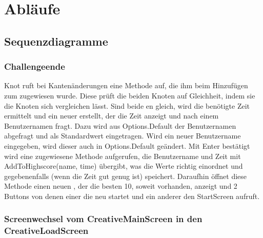 \chapter{Abläufe}

\section{Sequenzdiagramme}

\subsection{Challengeende}

Knot ruft bei Kantenänderungen eine Methode auf, die ihm beim Hinzufügen zum  zugewiesen wurde. Diese prüft die beiden Knoten auf Gleichheit, indem sie die Knoten sich vergleichen lässt. Sind beide en gleich, wird die benötigte Zeit ermittelt und ein neuer  erstellt, der die Zeit anzeigt und nach einem Benutzernamen fragt.
\newline
\newline
Dazu wird aus Options.Default der Benutzernamen abgefragt und als Standardwert eingetragen. Wird ein neuer Benutzername eingegeben, wird dieser auch in Options.Default geändert. Mit Enter bestätigt wird eine zugewiesene Methode aufgerufen, die Benutzername und Zeit  mit AddToHighscore(name, time) übergibt, was die Werte richtig einordnet und gegebenenfalls (wenn die Zeit gut genug ist) speichert.
\newline
\newline
Daraufhin öffnet diese Methode einen neuen , der die besten 10, soweit vorhanden, anzeigt und 2 Buttons 
von denen einer die  neu startet und ein anderer den StartScreen aufruft.

\subsection{Screenwechsel vom CreativeMainScreen in den CreativeLoadScreen}

